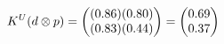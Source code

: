 \documentclass[preview]{standalone}
\begin{document}
\begin{align*}
\special{dvisvgm:raw <g id='unique000'>}K^U(d \otimes p) = \begin{pmatrix} (0.86)(0.80) \\ (0.83)(0.44) \end{pmatrix} = \begin{pmatrix} 0.69 \\ 0.37 \end{pmatrix}\special{dvisvgm:raw </g>}
\end{align*}
\end{document}
